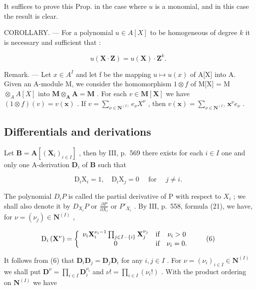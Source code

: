 It suffices to prove this Prop. in the case where \(u\) is a monomial, and in this case the result is clear.

COROLLARY. --- For a polynomial \(u \in A[X]\) to be homogeneous of degree \(k\) it is necessary and sufficient that :

\[
u (\mathbf {X} \cdot \mathbf {Z}) = u (\mathbf {X}) \cdot \mathbf {Z} ^ {k}.
\]

Remark. --- Let \(x \in A^{I}\) and let f be the mapping \(u \mapsto u(x)\) of A{[}X{]} into A. Given an A-module M, we consider the homomorphism \(1 \otimes f\) of M{[}X{]} = M \(\otimes_{A} A[X]\) into \(\mathbf{M} \otimes_{\mathbf{A}} \mathbf{A} = \mathbf{M}\) . For each \(v \in \mathbf{M}[\mathbf{X}]\) we have \((1 \otimes f)(v) = v(\mathbf{x})\) . If \(v = \sum_{\nu \in \mathbf{N}^{(I)}} e_{\nu} X^{\nu}\) , then \(v(\mathbf{x}) = \sum_{\nu \in \mathbf{N}^{(I)}} \mathbf{x}^{\nu} e_{\nu}\) .

\subsection{Differentials and derivations}

Let \(\mathbf{B} = \mathbf{A}[(\mathbf{X}_i)_{i\in I}]\) , then by III, p.~569 there exists for each \(i\in I\) one and only one A-derivation \(\mathbf{D}_i\) of \(\mathbf{B}\) such that

\[
\mathrm{D} _ {i} \mathrm{X} _ {i} = 1, \quad \mathrm{D} _ {i} \mathrm{X} _ {j} = 0 \quad \text { for } \quad j \neq i.\tag{5}
\]

The polynomial \(D_{i}P\) is called the partial derivative of P with respect to \(X_{i}\) ; we shall also denote it by \(D_{X_{i}}P\) or \(\frac{\partial P}{\partial X_{i}}\) or \(P'_{X_{i}}\) . By III, p.~558, formula (21), we have, for \(\nu = (\nu_{j}) \in \mathbf{N}^{(I)}\) ,

\[
\mathrm{D} _ {i} \left(\mathbf {X} ^ {\nu}\right) = \left\{ \begin{array}{c c c} \nu_ {i} \mathbf {X} _ {i} ^ {\nu_ {i} - 1} \prod_ {j \in I - \{i \}} \mathbf {X} _ {j} ^ {\nu_ {j}} & \text {if} & \nu_ {i} > 0 \\ 0 & \text {if} & \nu_ {i} = 0. \end{array} \right.\tag{6}
\]

It follows from (6) that \(\mathbf{D}_i\mathbf{D}_j = \mathbf{D}_j\mathbf{D}_i\) for any \(i, j \in I\) . For \(\nu = (\nu_i)_{i \in I} \in \mathbf{N}^{(I)}\) we shall put \(\mathbf{D}^{\nu} = \prod_{i \in I} \mathbf{D}_i^{\nu_i}\) and \(\nu! = \prod_{i \in I} (\nu_i!)\) . With the product ordering on \(\mathbf{N}^{(I)}\) we have

